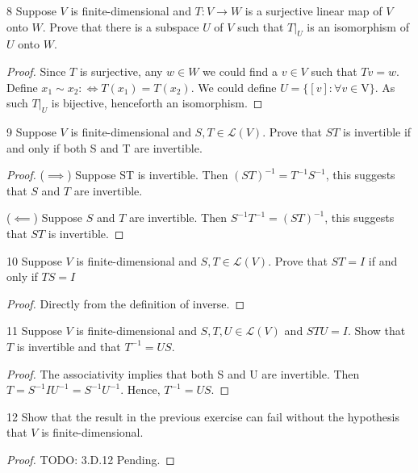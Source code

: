 \documentclass{article}
\newenvironment{problem}[1]{\begin{prob*}{#1}{}}{\end{prob*}}
\begin{document}
\newpage

\begin{problem}{8}
Suppose $V$ is finite-dimensional and $T: V \to W$ is a surjective linear map of $V$ onto $W$. Prove that there is a subspace $U $ of $V $ such that $T|_U$ is an isomorphism of $U$ onto $W$.
\end{problem}
\begin{proof}
	Since $T$ is surjective, any $w \in W$ we could find a $v \in V$ such that $Tv = w$. Define $x_1 \sim  x_2 :\iff T(x_1) = T(x_2)$. We could define $U = \{[v]: \forall v \in $V$\}$. As such $T|_U$ is bijective, henceforth an isomorphism.
\end{proof}

\begin{problem}{9}
Suppose $V$ is finite-dimensional and $S,T \in \mathcal{L}(V).$ Prove that $ST $ is invertible if and only if both S and T are invertible.
\end{problem}
\begin{proof}
	($\implies$) Suppose ST is invertible. Then $(ST)^{-1} = T^{-1}S^{-1}$, this suggests that $S$ and $T$ are invertible.

	($\impliedby$) Suppose $S$ and $T$ are invertible. Then $S^{-1}T^{-1} = (ST)^{-1}$, this suggests that $ST$ is invertible.
\end{proof}

\begin{problem}{10}
Suppose $V$ is finite-dimensional and $S,T \in \mathcal{L}(V)$. Prove that $ST = I$ if and only if $TS = I$
\end{problem}
\begin{proof}
	Directly from the definition of inverse.
\end{proof}

\begin{problem}{11}
Suppose $V$ is finite-dimensional and $S,T,U \in \mathcal{L}(V)$ and $STU = I.$ Show that $T $ is invertible and that $T^{-1} = US$.
\end{problem}
\begin{proof}
	The associativity implies that both S and U are invertible. Then $T = S^{-1}I U^{-1} = S^{-1} U^{-1}$. Hence, $T^{-1} = US$.
\end{proof}

\begin{problem}{12}
Show that the result in the previous exercise can fail without the hypothesis that $V$ is finite-dimensional.
\end{problem}
\begin{proof}
	TODO: 3.D.12 Pending.
\end{proof}
\end{document}
